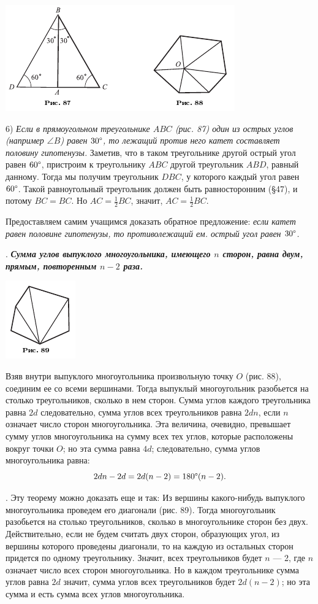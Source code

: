 \documentclass[oneside]{book}
\begin{document}
\includegraphics{pics/ris-87-88}

6) \emph{Если в прямоугольном треугольнике $ABC$ \emph{(рис. 87)} один из острых углов \emph{(например $\angle B$)} равен $30\degree$, то лежащий против него катет составляет половину гипотенузы.}
Заметив, что в таком треугольнике другой острый угол равен $60\degree$, пристроим к треугольнику $ABC$ другой треугольник $ABD$, равный данному.
Тогда мы получим треугольник $DBC$, у которого каждый угол равен $60\degree$.
Такой равноугольный треугольник должен быть равносторонним (§47), и потому $BC=BC$.
Но $AC=\tfrac12BC$, значит, $AC=\tfrac12BC$.

Предоставляем самим учащимся доказать обратное предложение:
\emph{если катет равен половине гипотенузы, то противолежащий ем.
острый угол равен $30\degree$.}

.
\textbf{\emph{Сумма углов выпуклого многоугольника, имеющего $n$ сторон, равна двум, прямым, повторенным $n-2$ раза.}}

\includegraphics{pics/ris-89}

Взяв внутри выпуклого многоугольника произвольную точку $O$ (рис. 88), соединим ее со всеми вершинами.
Тогда выпуклый многоугольник разобьется на столько треугольников, сколько в нем сторон.
Сумма углов каждого треугольника равна $2d$ следовательно, сумма углов всех треугольников равна $2dn$, если $n$ означает число сторон многоугольника.
Эта величина, очевидно, превышает сумму углов многоугольника на сумму всех тех углов, которые расположены вокруг точки $O$;
но эта сумма равна $4d$;
следовательно, сумма углов многоугольника равна:
\[2dn -2d= 2d(n - 2) = 180\degree(n - 2).\]

.
Эту теорему можно доказать еще и так:
Из вершины какого-нибудь выпуклого многоугольника проведем его диагонали (рис. 89).
Тогда многоугольник разобьется на столько треугольников, сколько в многоугольнике сторон без двух.
Действительно, если не будем считать двух сторон, образующих угол, из вершины которого проведены диагонали, то на каждую из остальных сторон придется по одному треугольнику.
Значит, всех треугольников будет $n$ — 2, где $n$ означает число всех сторон многоугольника.
Но в каждом треугольнике сумма углов равна $2d$ значит, сумма углов всех треугольников будет $2d(n-2)$;
но эта сумма и есть сумма всех углов многоугольника.
\end{document}
